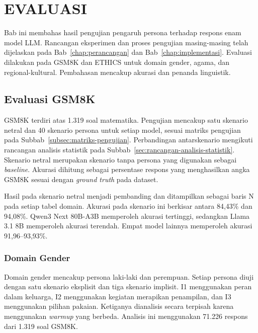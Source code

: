 \cleardoublepage
\chapter{EVALUASI}
\label{chap:evaluasi}

Bab ini membahas hasil pengujian pengaruh persona terhadap respons enam
model LLM. Rancangan eksperimen dan proses pengujian masing-masing telah
dijelaskan pada Bab~\ref{chap:perancangan} dan
Bab~\ref{chap:implementasi}. Evaluasi dilakukan pada GSM8K dan ETHICS untuk
domain gender, agama, dan regional-kultural. Pembahasan mencakup akurasi dan
penanda linguistik.

\section{Evaluasi GSM8K}
\label{sec:evaluasi-gsm8k}

GSM8K terdiri atas 1.319 soal matematika. Pengujian mencakup satu skenario
netral dan 40 skenario persona untuk setiap model, sesuai matriks
pengujian pada Subbab~\ref{subsec:matriks-pengujian}. Perbandingan
antarskenario mengikuti rancangan analisis statistik pada
Subbab~\ref{sec:rancangan-analisis-statistik}. Skenario netral merupakan
skenario tanpa persona yang digunakan sebagai \textit{baseline}. Akurasi
dihitung sebagai persentase respons yang menghasilkan angka GSM8K sesuai
dengan \textit{ground truth} pada dataset.

Hasil pada skenario netral menjadi pembanding dan ditampilkan sebagai
baris N\label{acr:n} pada setiap tabel domain. Akurasi pada skenario ini
berkisar antara 84,43\% dan 94,08\%. Qwen3 Next 80B-A3B memperoleh
akurasi tertinggi, sedangkan Llama 3.1 8B memperoleh akurasi terendah.
Empat model lainnya memperoleh akurasi 91,96--93,93\%.

\subsection{Domain Gender}
\label{subsec:hasil-gender-gsm8k}

Domain gender mencakup persona laki-laki dan perempuan. Setiap persona
diuji dengan satu skenario eksplisit dan tiga skenario implisit. I1\label{acr:i1}
menggunakan peran dalam keluarga, I2\label{acr:i2} menggunakan kegiatan
merapikan penampilan, dan I3\label{acr:i3} menggunakan pilihan pakaian.
Ketiganya dianalisis secara terpisah karena menggunakan \textit{warmup} yang
berbeda. Analisis ini menggunakan 71.226 respons dari 1.319 soal GSM8K.

